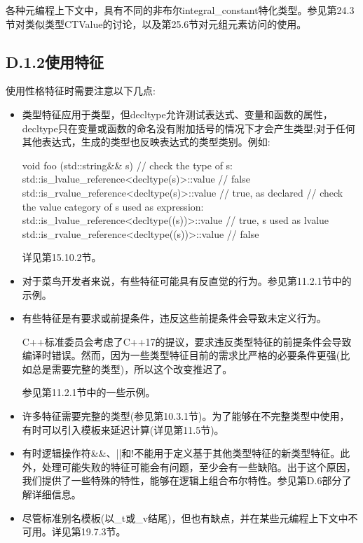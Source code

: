 各种元编程上下文中，具有不同的非布尔integral\_constant特化类型。参见第24.3节对类似类型CTValue的讨论，以及第25.6节对元组元素访问的使用。

\subsection{D.1.2\hspace{0.2cm}使用特征}

使用性格特征时需要注意以下几点:

\begin{itemize}
\item 
类型特征应用于类型，但decltype允许测试表达式、变量和函数的属性，decltype只在变量或函数的命名没有附加括号的情况下才会产生类型;对于任何其他表达式，生成的类型也反映表达式的类型类别。例如:

\begin{cpp}
void foo (std::string&& s)
{
	// check the type of s:
	std::is_lvalue_reference<decltype(s)>::value // false
	std::is_rvalue_reference<decltype(s)>::value // true, as declared
	// check the value category of s used as expression:
	std::is_lvalue_reference<decltype((s))>::value // true, s used as lvalue
	std::is_rvalue_reference<decltype((s))>::value // false
}
\end{cpp}

详见第15.10.2节。

\item 
对于菜鸟开发者来说，有些特征可能具有反直觉的行为。参见第11.2.1节中的示例。

\item 
有些特征是有要求或前提条件，违反这些前提条件会导致未定义行为。

\begin{notice}C++标准委员会考虑了C++17的提议，要求违反类型特征的前提条件会导致编译时错误。然而，因为一些类型特征目前的需求比严格的必要条件更强(比如总是需要完整的类型)，所以这个改变推迟了。
\end{notice}

参见第11.2.1节中的一些示例。

\item 
许多特征需要完整的类型(参见第10.3.1节)。为了能够在不完整类型中使用，有时可以引入模板来延迟计算(详见第11.5节)。

\item 
有时逻辑操作符\&\&、||和!不能用于定义基于其他类型特征的新类型特征。此外，处理可能失败的特征可能会有问题，至少会有一些缺陷。出于这个原因，我们提供了一些特殊的特性，能够在逻辑上组合布尔特性。参见第D.6部分了解详细信息。

\item 
尽管标准别名模板(以\_t或\_v结尾)，但也有缺点，并在某些元编程上下文中不可用。详见第19.7.3节。
\end{itemize}



